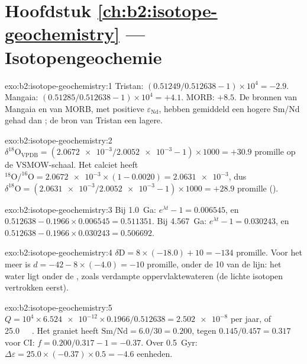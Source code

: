 \section*{Hoofdstuk \ref{ch:b2:isotope-geochemistry} --- Isotopengeochemie}

\begin{solution}{exo:b2:isotope-geochemistry:1}
Tristan: $(0.51249/0.512638 - 1)\times10^4 = -2.9$. Mangaia: $(0.51285/0.512638 -
1)\times10^4 = +4.1$. MORB: $+8.5$. De bronnen van Mangaia en van MORB, met positieve
$\varepsilon_{\mathrm{Nd}}$, hebben gemiddeld een hogere Sm/Nd gehad dan ; de
bron van Tristan een lagere.
\end{solution}

\begin{solution}{exo:b2:isotope-geochemistry:2}
$\delta^{18}\mathrm{O}_{\mathrm{VPDB}} = (\num{2.0672e-3}/\num{2.0052e-3} - 1)\times1000 =
+30.9$ promille op de VSMOW-schaal. Het calciet heeft $^{18}\mathrm{O}/^{16}\mathrm{O} =
\num{2.0672e-3}\times(1 - 0.0020) = \num{2.0631e-3}$, dus $\delta^{18}\mathrm{O} =
(\num{2.0631e-3}/\num{2.0052e-3} - 1)\times1000 = +28.9$ promille ().
\end{solution}

\begin{solution}{exo:b2:isotope-geochemistry:3}
Bij \qty{1.0}{Ga}: $e^{\lambda t} - 1 = 0.006545$, en $0.512638 - 0.1966\times0.006545 =
0.511351$. Bij \qty{4.567}{Ga}: $e^{\lambda t}-1 = 0.030243$, en $0.512638 -
0.1966\times0.030243 = 0.506692$.
\end{solution}

\begin{solution}{exo:b2:isotope-geochemistry:4}
$\delta\mathrm{D} = 8\times(-18.0) + 10 = -134$ promille. Voor het meer is $d = -42 -
8\times(-4.0) = -10$ promille, onder de 10 van de lijn: het water ligt onder de , zoals verdampte oppervlaktewateren (de lichte isotopen vertrokken eerst).
\end{solution}

\begin{solution}{exo:b2:isotope-geochemistry:5}
$Q = 10^4\times\num{6.524e-12}\times0.1966/0.512638 = \num{2.502e-8}$ per jaar, of
\qty{25.0}{\per\giga\year}. Het graniet heeft $\mathrm{Sm}/\mathrm{Nd} = 6.0/30 = 0.200$,
tegen $0.145/0.457 = 0.317$ voor CI: $f = 0.200/0.317 - 1 = -0.37$. Over
\qty{0.5}{Gyr}: $\Delta\varepsilon = 25.0\times(-0.37)\times0.5 = -4.6$ eenheden.
\end{solution}

